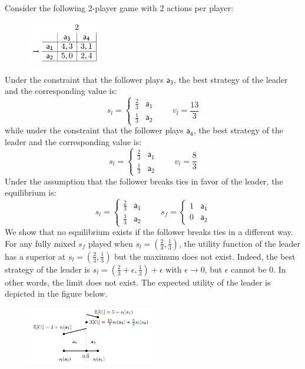 Consider the following 2-player game with 2 actions per player:
\begin{figure}[H]
\centering
\includegraphics[width=0.3\textwidth]{images/img_3_15_02.png}
\end{figure}
Under the constraint that the follower plays $\mathsf{a_3}$, the best strategy of the leader and the corresponding value is:
\[
s_{l}=\begin{cases}
\frac{2}{3} & \mathsf{a_1} \\
\frac{1}{3} & \mathsf{a_2}
\end{cases} \quad \quad v_{l}=\frac{13}{3}
\]
while under the constraint that the follower plays $\mathsf{a_4}$, the best strategy of the leader and the corresponding value is:
\[
s_{l}=\begin{cases}
\frac{2}{3} & \mathsf{a_1} \\
\frac{1}{3} & \mathsf{a_2}
\end{cases} \quad \quad v_{l}=\frac{8}{3}
\]
Under the assumption that the follower breaks ties in favor of the leader, the equilibrium is:
\[
s_{l}=
\begin{cases}
\frac{2}{3} & \mathsf{a_1} \\
\frac{1}{3} & \mathsf{a_2}
\end{cases} \quad \quad
s_{f}=
\begin{cases}
1 & \mathsf{a_1} \\
0 & \mathsf{a_2}
\end{cases}
\]
We show that no equilibrium exists if the follower breaks ties in a different way. For any fully mixed $s_f$ played when $s_l = (\frac{2}{3}, \frac{1}{3})$, the utility function of the leader has a superior at $s_l = (\frac{2}{3}, \frac{1}{3})$ but the maximum does not exist. Indeed, the best strategy of the leader is $s_l = (\frac{2}{3} + \epsilon, \frac{1}{3}) + \epsilon$ with $\epsilon \rightarrow 0$, but $\epsilon$ cannot be $0$. In other words, the limit does not exist. The expected utility of the leader is depicted in the figure below.
\begin{figure}[H]
\centering
\includegraphics[width=0.5\textwidth]{images/img_3_15_03.png}
\end{figure}

